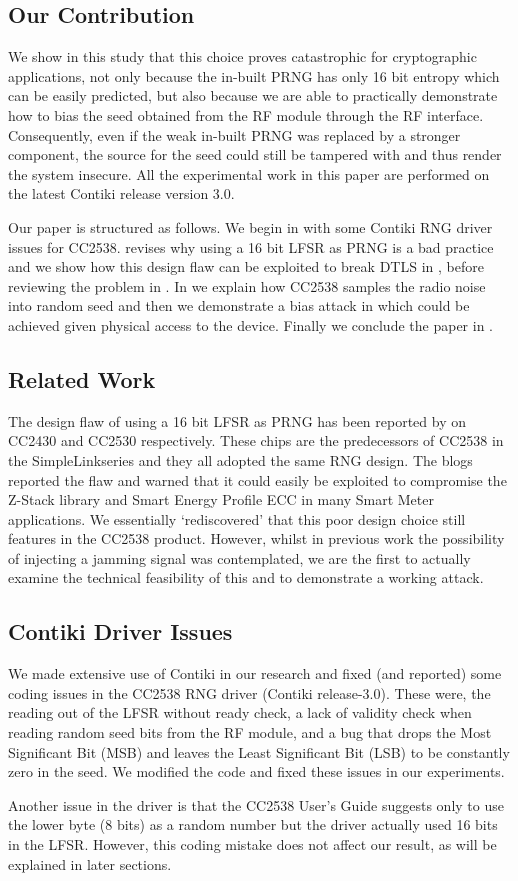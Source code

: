 \subsection{Our Contribution}
We show in this study that this choice proves catastrophic for cryptographic applications, not only because the in-built PRNG has only 16 bit entropy which can be easily predicted, but also because we are able to practically demonstrate how to bias the seed obtained from the RF module through the RF interface. Consequently, even if the weak in-built PRNG was replaced by a stronger component, the source for the seed could still be tampered with and thus render the system insecure. All the experimental work in this paper are performed on the latest Contiki release version 3.0.

Our paper is structured as follows. We begin in  with some Contiki RNG driver issues for CC2538.  revises why using a 16 bit LFSR as PRNG is a bad practice and we show how this design flaw can be exploited to break DTLS in , before reviewing the problem in . In  we explain how CC2538 samples the radio noise into random seed and then we demonstrate a bias attack in  which could be achieved given physical access to the device. Finally we conclude the paper in .

\subsection{Related Work}
The design flaw of using a 16 bit LFSR as PRNG has been reported by \cite{SmartMeterBlog}\cite{CC2530PRNG} on CC2430\cite{CC2430Manual} and CC2530\cite{CC2530Manual} respectively. These chips are the predecessors of CC2538 in the SimpleLink\texttrademark  series and they all adopted the same RNG design. The blogs reported the flaw and warned that it could easily be exploited to compromise the Z-Stack library\cite{ZStack} and Smart Energy Profile ECC in many Smart Meter applications. We essentially `rediscovered' that this poor design choice still features in the CC2538 product. However, whilst in previous work the possibility of injecting a jamming signal was contemplated, we are the first to actually examine the technical feasibility of this and to demonstrate a working attack.

\subsection{Contiki Driver Issues}\label{ContikiDriverIssue}
We made extensive use of Contiki in our research and fixed (and reported) some coding issues in the CC2538 RNG driver (Contiki release-3.0). These were, the reading out of the LFSR without ready check, a lack of validity check when reading random seed bits from the RF module, and a bug that drops the Most Significant Bit (MSB) and leaves the Least Significant Bit (LSB) to be constantly zero in the seed.  We modified the code and fixed these issues in our experiments. 

Another issue in the driver is that the CC2538 User's Guide\cite{CC2538Manual} suggests only to use the lower byte (8 bits) as a random number but the driver actually used 16 bits in the LFSR. However, this coding mistake does not affect our result, as will be explained in  later sections.